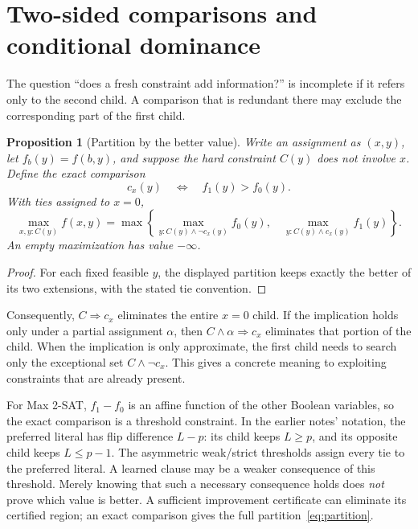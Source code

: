 \documentclass[11pt,a4paper]{article}
\newtheorem{proposition}[theorem]{Proposition}
\theoremstyle{definition}
\theoremstyle{remark}
\begin{document}
\section{Two-sided comparisons and conditional dominance}
\label{sec:comparison}

The question ``does a fresh constraint add information?'' is incomplete
if it refers only to the second child. A comparison that is redundant
there may exclude the corresponding part of the first child.

\begin{proposition}[Partition by the better value]\label{prop:partition}
Write an assignment as $(x,y)$, let $f_b(y)=f(b,y)$, and suppose the hard
constraint $C(y)$ does not involve $x$. Define the exact comparison
\[
 c_x(y)\quad\Longleftrightarrow\quad f_1(y)>f_0(y).
\]
With ties assigned to $x=0$,
\[
 \max_{x,y:C(y)} f(x,y)
 =\max\left\{
     \max_{y:C(y)\wedge\neg c_x(y)} f_0(y),\quad
     \max_{y:C(y)\wedge c_x(y)} f_1(y)
   \right\}.                                      \label{eq:partition}
\]
An empty maximization has value $-\infty$.
\end{proposition}
\begin{proof}
For each fixed feasible $y$, the displayed partition keeps exactly the
better of its two extensions, with the stated tie convention.
\end{proof}

Consequently, $C\Rightarrow c_x$ eliminates the entire $x=0$ child.
If the implication holds only under a partial assignment $\alpha$,
then $C\wedge\alpha\Rightarrow c_x$ eliminates that portion of the child.
When the implication is only approximate, the first child needs to search
only the exceptional set $C\wedge\neg c_x$. This gives a concrete meaning
to exploiting constraints that are already present.

For Max 2-SAT, $f_1-f_0$ is an affine function of the other Boolean
variables, so the exact comparison is a threshold constraint. In the
earlier notes' notation, the preferred literal has flip difference
$L-p$: its child keeps $L\ge p$, and its opposite child keeps
$L\le p-1$. The asymmetric weak/strict thresholds assign every tie
to the preferred literal. A learned clause may be a weaker consequence
of this threshold. Merely knowing that such a necessary consequence
holds does \emph{not} prove which value is better. A sufficient improvement
certificate can eliminate its certified region; an exact comparison gives
the full partition~\eqref{eq:partition}.
\end{document}
